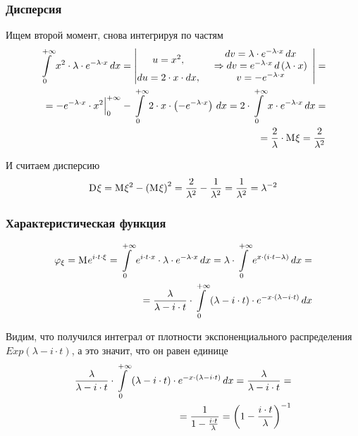 \subsubsection{Дисперсия}
Ищем второй момент, снова интегрируя по частям
\begin{align*}
    \integral{0}{+\infty}{x}{x^2 \cdot \lambda \cdot e^{-\lambda \cdot x}}
    = \begin{vmatrix}
        u = x^2, & \begin{array}{c}
            dv = \lambda \cdot e^{-\lambda \cdot x} \, dx\\
            \Rightarrow
                dv = e^{-\lambda \cdot x} \, d\left( \lambda \cdot x \right)
           \end{array}\\
        du = 2 \cdot x \cdot dx, & v = - e^{-\lambda \cdot x}
    \end{vmatrix} = \\
    = \Bigl. - e^{-\lambda \cdot x} \cdot x^2 \Bigr|_0^{+\infty}
        - \integral{0}{+\infty}{x}{
            2 \cdot x \cdot \left( - e^{-\lambda \cdot x} \right)}
    = 2 \cdot \integral{0}{+\infty}{x}{x \cdot e^{-\lambda \cdot x}} = \\
    = \frac{2}{\lambda} \cdot \mean{\xi} = \frac{2}{\lambda^2}
\end{align*}

И считаем дисперсию
$$\dispersion{\xi}
    = \mean{\xi^2} - \left( \mean{\xi} \right)^2
    = \frac{2}{\lambda^2} - \frac{1}{\lambda^2}
    = \frac{1}{\lambda^2} = \lambda^{-2}$$
\subsubsection{Характеристическая функция}
\begin{align*}
    \varphi_{\xi}
        = \mean{e^{i \cdot t \cdot \xi}}
        = \integral{0}{+\infty}{x}{
            e^{i \cdot t \cdot x} \cdot \lambda \cdot e^{-\lambda \cdot x}}
        = \lambda \cdot \integral{0}{+\infty}{x}{
            e^{x \cdot \left( i \cdot t - \lambda \right)}} = \\
        = \frac{\lambda}{\lambda - i \cdot t} \cdot \integral{0}{+\infty}{x}{
            \left( \lambda - i \cdot t \right)
                \cdot e^{- x \cdot \left( \lambda - i \cdot t \right)}}
\end{align*}

Видим, что получился интеграл от плотности
экспоненциального распределения $Exp\left( \lambda - i \cdot t \right)$,
а это значит, что он равен единице
\begin{align*}
    \frac{\lambda}{\lambda - i \cdot t} \cdot \integral{0}{+\infty}{x}{
        \left( \lambda - i \cdot t \right)
            \cdot e^{- x \cdot \left( \lambda - i \cdot t \right)}}
        = \frac{\lambda}{\lambda - i \cdot t} = \\
        = \frac{1}{1 - \frac{i \cdot t}{\lambda}}
        = \left( 1 - \frac{i \cdot t}{\lambda} \right)^{-1}
\end{align*}
